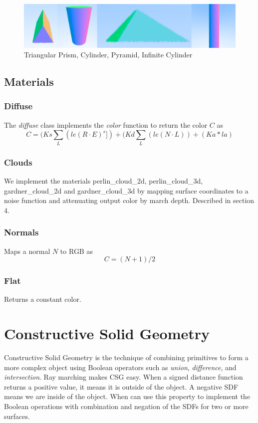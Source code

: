 \documentclass[sigconf, nonacm]{acmart}
\begin{document}
\begin{figure}[h]
  \centering
  \includegraphics[width=\linewidth]{images/surface-primitives.png}
  \caption{Triangular Prism, Cylinder, Pyramid, Infinite Cylinder}
\end{figure}

\subsection{Materials}
\subsubsection{Diffuse}
The \textit{diffuse} class implements the \textit{color} function to return the color $C$ as
$$
    C = (Ks\sum_L(le(R\cdot E)^s]) + (Kd\sum_L (le(N\cdot L)) + (Ka*la)
$$

\subsubsection{Clouds}

We implement the materials perlin\_cloud\_2d, perlin\_cloud\_3d, gardner\_cloud\_2d and gardner\_cloud\_3d by mapping surface coordinates to a noise function and attenuating output color by march depth. Described in section 4.

\subsubsection{Normals}

Maps a normal $N$ to RGB as
$$
    C = (N + 1)/2
$$

\subsubsection{Flat}

Returns a constant color.

\section{Constructive Solid Geometry}
Constructive Solid Geometry is the technique of combining primitives to form a more complex object using Boolean operators such as \textit{union}, \textit{difference}, and \textit{intersection}. Ray marching makes CSG easy. When a signed distance function returns a positive value, it means it is outside of the object. A negative SDF means we are inside of the object. When can use this property to implement the Boolean operations with combination and negation of the SDFs for two or more surfaces.
\end{document}
